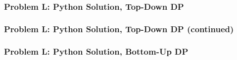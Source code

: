 \begin{frame}
  \frametitle{Problem L: Python Solution, Top-Down DP}
\end{frame}

\begin{frame}
  \frametitle{Problem L: Python Solution, Top-Down DP (continued)}
\end{frame}

\begin{frame}
  \frametitle{Problem L: Python Solution, Bottom-Up DP}
\end{frame}
